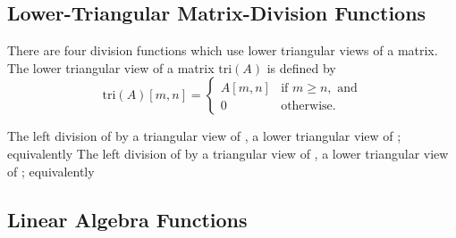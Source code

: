 \subsection{Lower-Triangular Matrix-Division Functions}

There are four division functions which use lower triangular views of
a matrix.  The lower triangular view of a matrix $\mbox{tri}(A)$ is defined by
\[
\mbox{tri}(A)[m,n] = 
\left\{
\begin{array}{ll}
A[m,n] & \mbox{if } m \geq n, \mbox{ and}
\\[4pt]
0 & \mbox{otherwise}.
\end{array}
\right.
\]


\begin{description}
%
%
%
%
The left division of  by a triangular view of
, a lower triangular view of ; equivalently
%
The left division of  by a triangular view of
, a lower triangular view of ; equivalently
%
\end{description}


\subsection{Linear Algebra Functions}

